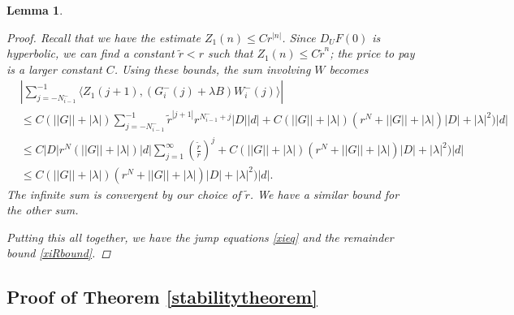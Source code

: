 \documentclass[12pt]{article}
\newtheorem{lemma}{Lemma}
\begin{document}
\begin{lemma}
\begin{proof}
Recall that we have the estimate $Z_1(n) \leq C r^{|n|}$. Since $D_U F(0)$ is hyperbolic, we can find a constant $\tilde{r} < r$ such that $Z_1(n) \leq C \tilde{r}^n$; the price to pay is a larger constant $C$. Using these bounds, the sum involving $W$ becomes
\begin{align*}
&\left| \sum_{j = -N_{i-1}^-}^{-1} \langle Z_1(j+1), 
(G_i^-(j) + \lambda B) W_i^-(j) \rangle \right| \\
&\leq C (||G|| + |\lambda|) \sum_{j = -N_{i-1}^-}^{-1} \tilde{r}^{|j+1|} r^{N_{i-1}^- + j}|D||d| + C (||G|| + |\lambda|)(r^N + ||G|| + |\lambda|)|D| + |\lambda|^2 )|d| \\
&\leq C |D| r^N (||G|| + |\lambda|)|d| \sum_{j = 1}^\infty \left( \frac{\tilde{r}}{r}\right)^j + C (||G|| + |\lambda|)(r^N + ||G|| + |\lambda|)|D| + |\lambda|^2 )|d| \\
&\leq C (||G|| + |\lambda|)(r^N + ||G|| + |\lambda|)|D| + |\lambda|^2 )|d|.
\end{align*}
The infinite sum is convergent by our choice of $\tilde{r}$. We have a similar bound for the other sum.

Putting this all together, we have the jump equations \eqref{xieq} and the remainder bound \eqref{xiRbound}.
\end{proof}
\end{lemma}

\subsection{Proof of Theorem \ref{stabilitytheorem}}
\end{document}
